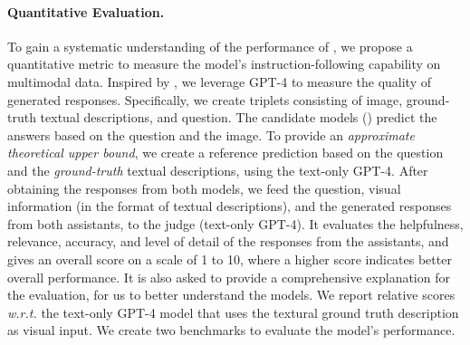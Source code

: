 \paragraph{Quantitative Evaluation.}
To gain a systematic understanding of the performance of \shortname{}, we propose a quantitative metric to measure the model's instruction-following capability on multimodal data. Inspired by \cite{vicuna}, we leverage GPT-4 to measure the quality of generated responses.
Specifically, we create triplets consisting of image, ground-truth textual descriptions, and question. The candidate models (\eg \shortname{}) predict the answers based on the question and the image.
To provide an \emph{approximate theoretical upper bound}, we create a reference prediction based on the question and the \emph{ground-truth} textual descriptions, using the text-only GPT-4.
After obtaining the responses from both models, we feed the question, visual information (in the format of textual descriptions), and the generated responses from both assistants, to the judge (\ie text-only GPT-4).  It evaluates the helpfulness, relevance, accuracy, and level of detail of the responses from the assistants, and gives an overall score on a scale of 1 to 10, where a higher score indicates better overall performance.  It is also asked to provide a comprehensive explanation for the evaluation, for us to better understand the models.
We report relative scores {\it w.r.t.} the text-only GPT-4 model that uses the textural ground truth description as visual input.
We create two benchmarks to evaluate the model's performance.


